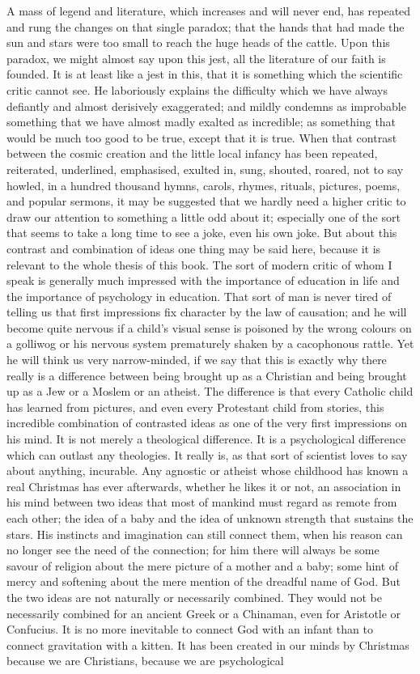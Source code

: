 A mass of legend and literature, which increases and will never end, has repeated and rung the changes on that single paradox; that the hands that had made the sun and stars were too small to reach the huge heads of the cattle. Upon this paradox, we might almost say upon this jest, all the literature of our faith is founded. It is at least like a jest in this, that it is something which the scientific critic cannot see. He laboriously explains the difficulty which we have always defiantly and almost derisively exaggerated; and mildly condemns as improbable something that we have almost madly exalted as incredible; as something that would be much too good to be true, except that it is true. When that contrast between the cosmic creation and the little local infancy has been repeated, reiterated, underlined, emphasised, exulted in, sung, shouted, roared, not to say howled, in a hundred thousand hymns, carols, rhymes, rituals, pictures, poems, and popular sermons, it may be suggested that we hardly need a higher critic to draw our attention to something a little odd about it; especially one of the sort that seems to take a long time to see a joke, even his own joke. But about this contrast and combination of ideas one thing may be said here, because it is relevant to the whole thesis of this book. The sort of modern critic of whom I speak is generally much impressed with the importance of education in life and the importance of psychology in education. That sort of man is never tired of telling us that first impressions fix character by the law of causation; and he will become quite nervous if a child's visual sense is poisoned by the wrong colours on a golliwog or his nervous system prematurely shaken by a cacophonous rattle. Yet he will think us very narrow-minded, if we say that this is exactly why there really is a difference between being brought up as a Christian and being brought up as a Jew or a Moslem or an atheist. The difference is that every Catholic child has learned from pictures, and even every Protestant child from stories, this incredible combination of contrasted ideas as one of the very first impressions on his mind. It is not merely a theological difference. It is a psychological difference which can outlast any theologies. It really is, as that sort of scientist loves to say about anything, incurable. Any agnostic or atheist whose childhood has known a real Christmas has ever afterwards, whether he likes it or not, an association in his mind between two ideas that most of mankind must regard as remote from each other; the idea of a baby and the idea of unknown strength that sustains the stars. His instincts and imagination can still connect them, when his reason can no longer see the need of the connection; for him there will always be some savour of religion about the mere picture of a mother and a baby; some hint of mercy and softening about the mere mention of the dreadful name of God. But the two ideas are not naturally or necessarily combined. They would not be necessarily combined for an ancient Greek or a Chinaman, even for Aristotle or Confucius. It is no more inevitable to connect God with an infant than to connect gravitation with a kitten. It has been created in our minds by Christmas because we are Christians, because we are psychological 